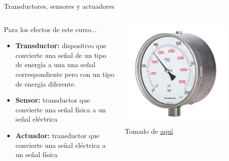 \documentclass[aspectratio=169]{beamer}
\begin{document}
\begin{frame}{Transductores, sensores y actuadores}
    \begin{columns}[c, onlytextwidth]
        \begin{column}{0.6\textwidth}
        Para los efectos de este curso...\\[8pt]
        \begin{itemize}
            \item \textbf{Transductor:} dispositivo que convierte una señal de un tipo de energía a una
            una señal correspondiente pero con un tipo de energía diferente.
            \item \textbf{Sensor:} transductor que convierte una señal física a un señal eléctrica
            \item \textbf{Actuador:} transductor que convierte una señal eléctrica a un señal física
        \end{itemize}
        \end{column}
        \begin{column}{0.4\textwidth}
            \begin{center}
               \includegraphics[width=0.8\textwidth]{fig/bourdon.jpg}\\
               \tiny{Tomado de \href{https://upload.wikimedia.org/wikipedia/commons/thumb/7/74/MAXIMATOR-High-Pressure-Manometer-01a.jpg/1200px-MAXIMATOR-High-Pressure-Manometer-01a.jpg}{aquí}}
            \end{center}
        \end{column}
    \end{columns}
\end{frame}
\end{document}
